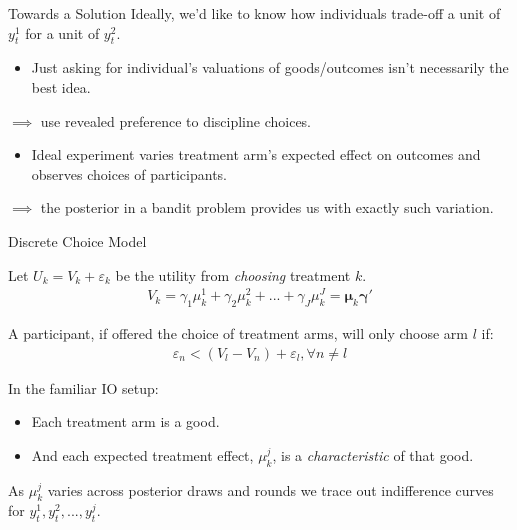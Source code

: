 \documentclass[aspectratio=169,xcolor=dvipsnames]{beamer}
\begin{document}
\begin{frame}{Towards a Solution}
Ideally, we'd like to know how individuals trade-off a unit of $y_t^1$ for a unit of 
$y^2_t$.   
    
    \begin{itemize}
        \item Just asking for individual's valuations of goods/outcomes 
        isn't necessarily the best idea.
    \end{itemize}
         $\implies$ use revealed preference to discipline choices.
\begin{itemize}
    \item Ideal experiment varies treatment arm's expected effect on 
    outcomes and observes choices of participants.
\end{itemize}

$\implies$ the posterior in a bandit problem provides us with exactly such variation.


\end{frame}




\begin{frame}{Discrete Choice Model}

Let $U_k = V_k + \varepsilon_k$ be the utility from \textit{choosing} treatment $k$.
\begin{align*}
V_k = 
\gamma_1 \mu^1_k + \gamma_2 \mu^2_k + ... + \gamma_J \mu^J_k = \bm{\mu}_k\bm{\gamma}'
\end{align*}
 
     A participant, if offered the choice 
of treatment arms, will only choose arm $l$ if:
 \begin{align*}
  \varepsilon_n < (V_l - V_n) + \varepsilon_l, 
\forall n \neq l
 \end{align*}



In the familiar IO setup:

\begin{itemize}
    \item Each treatment arm is a good.
    \item And each expected treatment effect, $\mu_k^j$,  is a \textit{characteristic} of that good.
\end{itemize}

As $\mu_k^j$ varies across posterior draws and rounds we trace out indifference 
curves for $y_t^1, y_t^2, ..., y_t^j$.


\end{frame}
\end{document}
